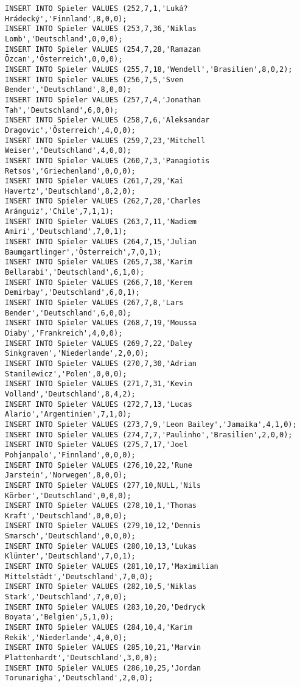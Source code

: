 \documentclass{lehramt-informatik-aufgabe}
\begin{document}
\begin{verbatim}
INSERT INTO Spieler VALUES (252,7,1,'Luká? Hrádecký','Finnland',8,0,0);
INSERT INTO Spieler VALUES (253,7,36,'Niklas Lomb','Deutschland',0,0,0);
INSERT INTO Spieler VALUES (254,7,28,'Ramazan Özcan','Österreich',0,0,0);
INSERT INTO Spieler VALUES (255,7,18,'Wendell','Brasilien',8,0,2);
INSERT INTO Spieler VALUES (256,7,5,'Sven Bender','Deutschland',8,0,0);
INSERT INTO Spieler VALUES (257,7,4,'Jonathan Tah','Deutschland',6,0,0);
INSERT INTO Spieler VALUES (258,7,6,'Aleksandar Dragovic','Österreich',4,0,0);
INSERT INTO Spieler VALUES (259,7,23,'Mitchell Weiser','Deutschland',4,0,0);
INSERT INTO Spieler VALUES (260,7,3,'Panagiotis Retsos','Griechenland',0,0,0);
INSERT INTO Spieler VALUES (261,7,29,'Kai Havertz','Deutschland',8,2,0);
INSERT INTO Spieler VALUES (262,7,20,'Charles Aránguiz','Chile',7,1,1);
INSERT INTO Spieler VALUES (263,7,11,'Nadiem Amiri','Deutschland',7,0,1);
INSERT INTO Spieler VALUES (264,7,15,'Julian Baumgartlinger','Österreich',7,0,1);
INSERT INTO Spieler VALUES (265,7,38,'Karim Bellarabi','Deutschland',6,1,0);
INSERT INTO Spieler VALUES (266,7,10,'Kerem Demirbay','Deutschland',6,0,1);
INSERT INTO Spieler VALUES (267,7,8,'Lars Bender','Deutschland',6,0,0);
INSERT INTO Spieler VALUES (268,7,19,'Moussa Diaby','Frankreich',4,0,0);
INSERT INTO Spieler VALUES (269,7,22,'Daley Sinkgraven','Niederlande',2,0,0);
INSERT INTO Spieler VALUES (270,7,30,'Adrian Stanilewicz','Polen',0,0,0);
INSERT INTO Spieler VALUES (271,7,31,'Kevin Volland','Deutschland',8,4,2);
INSERT INTO Spieler VALUES (272,7,13,'Lucas Alario','Argentinien',7,1,0);
INSERT INTO Spieler VALUES (273,7,9,'Leon Bailey','Jamaika',4,1,0);
INSERT INTO Spieler VALUES (274,7,7,'Paulinho','Brasilien',2,0,0);
INSERT INTO Spieler VALUES (275,7,17,'Joel Pohjanpalo','Finnland',0,0,0);
INSERT INTO Spieler VALUES (276,10,22,'Rune Jarstein','Norwegen',8,0,0);
INSERT INTO Spieler VALUES (277,10,NULL,'Nils Körber','Deutschland',0,0,0);
INSERT INTO Spieler VALUES (278,10,1,'Thomas Kraft','Deutschland',0,0,0);
INSERT INTO Spieler VALUES (279,10,12,'Dennis Smarsch','Deutschland',0,0,0);
INSERT INTO Spieler VALUES (280,10,13,'Lukas Klünter','Deutschland',7,0,1);
INSERT INTO Spieler VALUES (281,10,17,'Maximilian Mittelstädt','Deutschland',7,0,0);
INSERT INTO Spieler VALUES (282,10,5,'Niklas Stark','Deutschland',7,0,0);
INSERT INTO Spieler VALUES (283,10,20,'Dedryck Boyata','Belgien',5,1,0);
INSERT INTO Spieler VALUES (284,10,4,'Karim Rekik','Niederlande',4,0,0);
INSERT INTO Spieler VALUES (285,10,21,'Marvin Plattenhardt','Deutschland',3,0,0);
INSERT INTO Spieler VALUES (286,10,25,'Jordan Torunarigha','Deutschland',2,0,0);

\end{verbatim}
\end{document}
